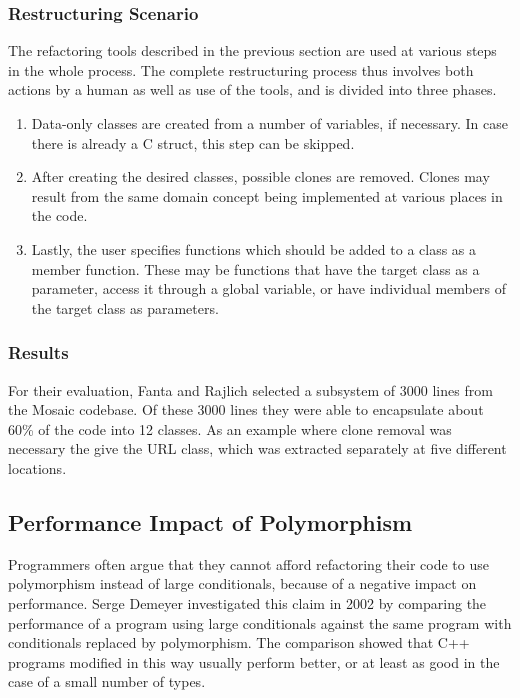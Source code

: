 \documentclass[conference,compsoc,a4paper]{IEEEtran}
\newcommand{\code}[1]{{\small\ttfamily #1}}
\begin{document}
\subsubsection{Restructuring Scenario}

The refactoring tools described in the previous section are used at various steps in the whole process. The complete 
restructuring process thus involves both actions by a human as well as use of the tools, and is divided into three 
phases.

\begin{enumerate}
  \item Data-only classes are created from a number of variables, if necessary. In case there is already a C 
  \code{struct}, this step can be skipped.
  
  \item After creating the desired classes, possible clones are removed. Clones may result from the same domain concept 
  being implemented at various places in the code.
  
  \item Lastly, the user specifies functions which should be added to a class as a member function. These may be 
  functions that have the target class as a parameter, access it through a global variable, or have individual members 
  of the target class as parameters.
\end{enumerate}

\subsubsection{Results}

For their evaluation, Fanta and Rajlich selected a subsystem of 3000 lines from the Mosaic codebase. Of these 3000 
lines they were able to encapsulate about 60\% of the code into 12 classes. As an example where clone removal was 
necessary the give the URL class, which was extracted separately at five different locations.

\subsection{Performance Impact of Polymorphism} \label{sec:polymorphism}

Programmers often argue that they cannot afford refactoring their code to use polymorphism instead of large 
conditionals, because of a negative impact on performance. Serge Demeyer investigated this claim in 2002 
\cite{polymorphism} by comparing the performance of a program using large conditionals against the same program with 
conditionals replaced by polymorphism. The comparison showed that C++ programs modified in this way usually perform 
better, or at least as good in the case of a small number of types.
\end{document}
